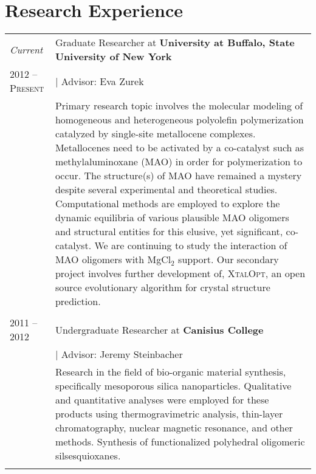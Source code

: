 \documentclass[letterpaper,10pt]{article} %
\begin{document}

\section{Research Experience}
\noindent 
\begin{tabular}{R{3cm}|p{13cm}} 

\emph{Current} & Graduate Researcher at \textbf{University at Buffalo, State University of New York} \\
\textsc{2012 -- Present} & \hspace{3mm} \small | Advisor: Eva Zurek \\ 
& \footnotesize{Primary research topic involves the molecular modeling of homogeneous and heterogeneous polyolefin polymerization catalyzed by single-site metallocene complexes. Metallocenes need to be activated by a co-catalyst such as methylaluminoxane (MAO) in order for polymerization to occur. The structure(s) of MAO have remained a mystery despite several experimental and theoretical studies. Computational methods are employed to explore the dynamic equilibria of various plausible MAO oligomers and structural entities for this elusive, yet significant, co-catalyst. We are continuing to study the interaction of MAO oligomers with MgCl$_{2}$ support. Our secondary project involves further development of, \textsc{XtalOpt}, an open source evolutionary algorithm for crystal structure prediction.}\\
 \\


\textsc{2011 -- 2012} & Undergraduate Researcher at \textbf{Canisius College} \\
& \hspace{3mm} \small | Advisor: Jeremy Steinbacher \\ 
& \footnotesize{Research in the field of bio-organic material synthesis, specifically mesoporous silica nanoparticles. Qualitative and quantitative analyses were employed for these products using thermogravimetric analysis, thin-layer chromatography, nuclear magnetic resonance, and other methods. Synthesis of functionalized polyhedral oligomeric silsesquioxanes.}\\
 \\


\end{tabular}
\end{document}
